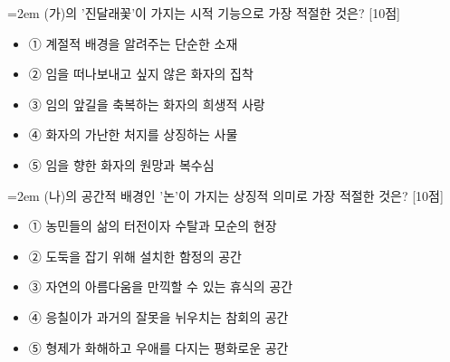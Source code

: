 \documentclass[11pt,a4paper]{article}
\newcommand{\qnum}[1]{%
  \tikz[baseline=(num.base)]{%
    \node[circle, fill=numCircle, text=white, inner sep=0pt,
          minimum size=18pt, font=\small\bfseries] (num) {#1};%
  }%
}
\newcommand{\pts}[1]{%
  \hfill\textcolor{ptsBadge}{[#1점]}%
}
\begin{document}
\vspace{4mm}
\begin{minipage}{\columnwidth}
{\hangindent=2em
\qnum{6}\enspace (가)의 '진달래꽃'이 가지는 시적 기능으로 가장 적절한 것은? \pts{10}
\par}

\vspace{3mm}
\begin{itemize}[leftmargin=2.5em, labelsep=0.3em, label={}, itemsep=4pt, parsep=1pt, topsep=0pt]
  \item ① 계절적 배경을 알려주는 단순한 소재
  \item ② 임을 떠나보내고 싶지 않은 화자의 집착
  \item ③ 임의 앞길을 축복하는 화자의 희생적 사랑
  \item ④ 화자의 가난한 처지를 상징하는 사물
  \item ⑤ 임을 향한 화자의 원망과 복수심
\end{itemize}
\end{minipage}
\vspace{4mm}

\vspace{4mm}
\begin{minipage}{\columnwidth}
{\hangindent=2em
\qnum{7}\enspace (나)의 공간적 배경인 '논'이 가지는 상징적 의미로 가장 적절한 것은? \pts{10}
\par}

\vspace{3mm}
\begin{itemize}[leftmargin=2.5em, labelsep=0.3em, label={}, itemsep=4pt, parsep=1pt, topsep=0pt]
  \item ① 농민들의 삶의 터전이자 수탈과 모순의 현장
  \item ② 도둑을 잡기 위해 설치한 함정의 공간
  \item ③ 자연의 아름다움을 만끽할 수 있는 휴식의 공간
  \item ④ 응칠이가 과거의 잘못을 뉘우치는 참회의 공간
  \item ⑤ 형제가 화해하고 우애를 다지는 평화로운 공간
\end{itemize}
\end{minipage}
\vspace{4mm}
\end{document}
